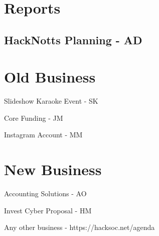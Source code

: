 \documentclass[11pt,hacksoc,agenda]{meetingmins}
\begin{document}
\maketitle

\section{Reports}

\subsection{HackNotts Planning - AD}
\begin{hiddensubitems}
  \item
\end{hiddensubitems}

\section{Old Business}
\begin{items}
  \item Slideshow Karaoke Event - SK
  \item Core Funding - JM
  \item Instagram Account - MM
\end{items}

\section{New Business}
\begin{items}
  \item Accounting Solutions - AO
  \item Invest Cyber Proposal - HM
  \item Any other business - https://hacksoc.net/agenda
\end{items}

\vspace{1em}
\nextmeeting{}
\end{document}
